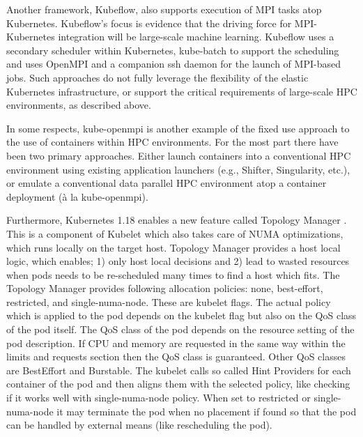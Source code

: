 \documentclass[conference]{IEEEtran}
\begin{document}
Another framework, Kubeflow, also supports execution of MPI tasks atop Kubernetes. Kubeflow’s focus is evidence that the driving force for MPI-Kubernetes integration will be large-scale machine learning. Kubeflow uses a secondary scheduler within Kubernetes, kube-batch to support the scheduling and uses OpenMPI and a companion ssh daemon for the launch of MPI-based jobs. Such approaches do not fully leverage the flexibility of the elastic Kubernetes infrastructure, or support the critical requirements of large-scale HPC environments, as described above.

In some respects, kube-openmpi is another example of the fixed use approach to the use of containers within HPC environments. For the most part there have been two primary approaches. Either launch containers into a conventional HPC environment using existing application launchers (e.g., Shifter, Singularity, etc.), or emulate a conventional data parallel HPC environment atop a container deployment (à la kube-openmpi).

Furthermore, Kubernetes 1.18 enables a new feature called Topology Manager \cite{gridengine-topology}. This is a component of Kubelet which also takes care of NUMA optimizations, which runs locally on the target host. Topology Manager provides a host local logic, which enables; 1) only host local decisions and 2) lead to wasted resources when pods needs to be re-scheduled many times to find a host which fits. The Topology Manager provides following allocation policies: none, best-effort, restricted, and single-numa-node. These are kubelet flags. The actual policy which is applied to the pod depends on the kubelet flag but also on the QoS class of the pod itself. The QoS class of the pod depends on the resource setting of the pod description. If CPU and memory are requested in the same way within the limits and requests section then the QoS class is guaranteed. Other QoS classes are BestEffort and Burstable. The kubelet calls so called Hint Providers for each container of the pod and then aligns them with the selected policy, like checking if it works well with single-numa-node policy. When set to restricted or single-numa-node it may terminate the pod when no placement if found so that the pod can be handled by external means (like rescheduling the pod).
\end{document}
